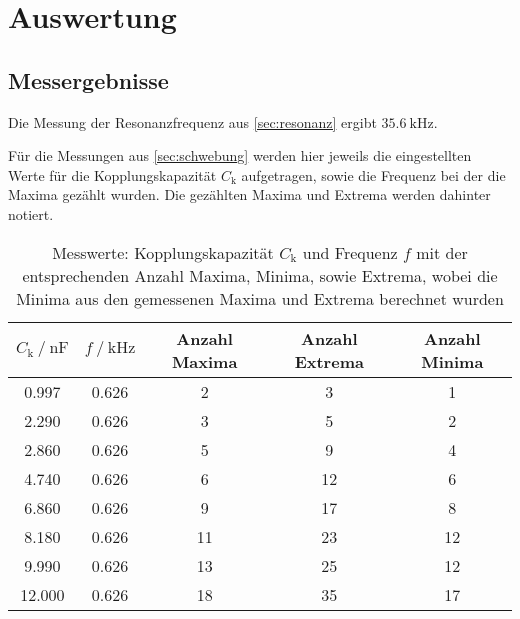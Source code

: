 \section{Auswertung}
\label{sec:Auswertung}




\subsection{Messergebnisse}


Die Messung der Resonanzfrequenz aus \autoref{sec:resonanz} ergibt $\SI{35.6}{\kilo\hertz}$.

Für die Messungen aus \autoref{sec:schwebung} werden hier jeweils die eingestellten Werte für die Kopplungskapazität $C_\text{k}$ aufgetragen, sowie die Frequenz bei der die Maxima gezählt wurden. Die gezählten Maxima und Extrema werden dahinter notiert. 

\begin{table}
  \centering
  \caption{Messwerte: Kopplungskapazität $C_\text{k}$ und Frequenz $f$ mit der entsprechenden Anzahl Maxima, Minima, sowie Extrema, wobei die Minima aus den gemessenen Maxima und Extrema berechnet wurden}
  \label{tab:schwebung}
  \begin{tabular}{c c c c c}
    \toprule 
    $C_\text{k} \:/\: \si{\nano\farad}$ & $f \:/\: \si{\kilo\hertz}$ & Anzahl Maxima &  Anzahl Extrema & Anzahl Minima \\ 
    \midrule 
    0.997 & 0.626 & 2 & 3 & 1 \\
    2.290 & 0.626 & 3 & 5 & 2 \\
    2.860 & 0.626 & 5 & 9 & 4 \\
    4.740 & 0.626 & 6 & 12 & 6 \\
    6.860 & 0.626 & 9 & 17 & 8 \\
    8.180 & 0.626 & 11 & 23 & 12 \\
    9.990 & 0.626 & 13 & 25 & 12 \\
    12.000 & 0.626 & 18 & 35 & 17 \\
    \bottomrule
  \end{tabular}
\end{table}

